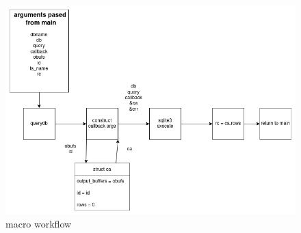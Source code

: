 \begin{figure} [H]
  \centering
  \includegraphics[width=\textwidth]{images/querydb_macro.png}
  \caption{\label{fig:querydb} \querydb macro workflow}
\end{figure}
